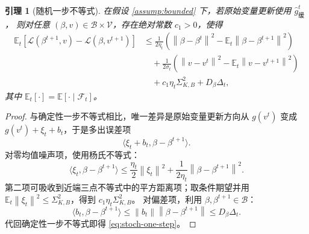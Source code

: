 \documentclass[UTF8,a4paper,11pt]{ctexart}
\newtheorem{lemma}{引理}
\newcommand{\E}{\mathbb{E}}
\newcommand{\V}{\mathcal{V}}
\newcommand{\B}{\mathcal{B}}
\newcommand{\F}{\mathcal{F}}
\newcommand{\norm}[1]{\left\|#1\right\|}
\begin{document}
\begin{lemma}[随机一步不等式]
\label{lem:stoch-one-step}
在假设 \ref{assump:bounded} 下，若原始变量更新使用 $\widehat g^t_{\text{缓}}$，
则对任意 $(\beta,v)\in\B\times\V$，存在绝对常数 $c_1>0$，使得
\begin{align}
    \E_t[
    \mathcal{L}(\beta^{t+1},v)
    -
    \mathcal{L}(\beta,v^{t+1})
    ]
    &\le
    \frac{1}{2\eta_t}
    \left(
        \norm{\beta-\beta^t}^2
        -
        \E_t\norm{\beta-\beta^{t+1}}^2
    \right)
    \nonumber\\
    &\quad+
    \frac{1}{2\sigma_t}
    \left(
        \norm{v-v^t}^2
        -
        \E_t\norm{v-v^{t+1}}^2
    \right)
    \nonumber\\
    &\quad+
    c_1\eta_t\Sigma_{K,B}^2
    +
    D_\beta\Delta_t,
    \label{eq:stoch-one-step}
\end{align}
其中 $\E_t[\cdot]=\E[\cdot\mid\F_t]$。
\end{lemma}

\begin{proof}
与确定性一步不等式相比，唯一差异是原始变量更新方向从 $g(v^t)$ 变成
$g(v^t)+\xi_t+b_t$，于是多出误差项
\[
    \langle \xi_t+b_t,\beta-\beta^{t+1}\rangle.
\]
对零均值噪声项，使用杨氏不等式：
\[
    \langle \xi_t,\beta-\beta^{t+1}\rangle
    \le
    \frac{\eta_t}{2}\norm{\xi_t}^2
    +
    \frac{1}{2\eta_t}\norm{\beta-\beta^{t+1}}^2.
\]
第二项可吸收到近端三点不等式中的平方距离项；取条件期望并用
$\E_t\norm{\xi_t}^2\le\Sigma_{K,B}^2$，得到 $c_1\eta_t\Sigma_{K,B}^2$。
对偏差项，利用 $\beta,\beta^{t+1}\in\B$：
\[
    \langle b_t,\beta-\beta^{t+1}\rangle
    \le
    \norm{b_t}\norm{\beta-\beta^{t+1}}
    \le
    D_\beta\Delta_t.
\]
代回确定性一步不等式即得 \eqref{eq:stoch-one-step}。
\end{proof}
\end{document}
